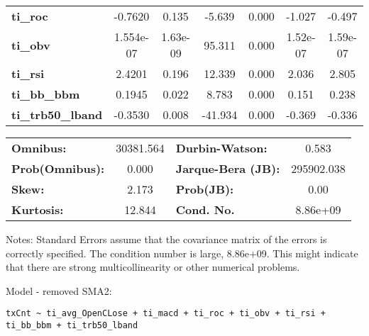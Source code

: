 \begin{center}
\begin{tabular}{lcccccc}
\textbf{ti\_roc}            &      -0.7620  &        0.135     &    -5.639  &         0.000        &       -1.027    &       -0.497     \\
\textbf{ti\_obv}            &    1.554e-07  &     1.63e-09     &    95.311  &         0.000        &     1.52e-07    &     1.59e-07     \\
\textbf{ti\_rsi}            &       2.4201  &        0.196     &    12.339  &         0.000        &        2.036    &        2.805     \\
\textbf{ti\_bb\_bbm}        &       0.1945  &        0.022     &     8.783  &         0.000        &        0.151    &        0.238     \\
\textbf{ti\_trb50\_lband}   &      -0.3530  &        0.008     &   -41.934  &         0.000        &       -0.369    &       -0.336     \\
\bottomrule
\end{tabular}
\begin{tabular}{lclc}
\textbf{Omnibus:}       & 30381.564 & \textbf{  Durbin-Watson:     } &     0.583   \\
\textbf{Prob(Omnibus):} &    0.000  & \textbf{  Jarque-Bera (JB):  } & 295902.038  \\
\textbf{Skew:}          &    2.173  & \textbf{  Prob(JB):          } &      0.00   \\
\textbf{Kurtosis:}      &   12.844  & \textbf{  Cond. No.          } &  8.86e+09   \\
\bottomrule
\end{tabular}
\end{center}

Notes: \newline
 [1] Standard Errors assume that the covariance matrix of the errors is correctly specified. \newline
 [2] The condition number is large, 8.86e+09. This might indicate that there are \newline
 strong multicollinearity or other numerical problems.

Model - removed SMA2: \begin{verbatim}txCnt ~ ti_avg_OpenCLose + ti_macd + ti_roc + ti_obv + ti_rsi + ti_bb_bbm + ti_trb50_lband\end{verbatim}


